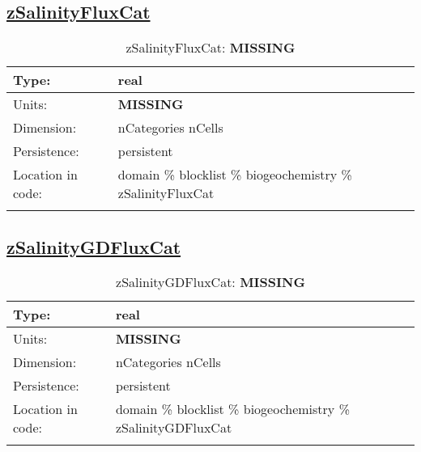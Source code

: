 \subsection[zSalinityFluxCat]{\hyperref[sec:var_tab_biogeochemistry]{zSalinityFluxCat}}
\label{subsec:var_sec_biogeochemistry_zSalinityFluxCat}
\begin{center}
\begin{longtable}{| p{2.0in} | p{4.0in} |}
        \hline 
        Type: & real \\
        \hline 
        Units: & {\bf \color{red} MISSING} \\
        \hline 
        Dimension: & nCategories nCells \\
        \hline 
        Persistence: & persistent \\
        \hline 
         Location in code: & domain \% blocklist \% biogeochemistry \% zSalinityFluxCat \\
         \hline 
    \caption{zSalinityFluxCat: {\bf \color{red} MISSING}}
\end{longtable}
\end{center}
\subsection[zSalinityGDFluxCat]{\hyperref[sec:var_tab_biogeochemistry]{zSalinityGDFluxCat}}
\label{subsec:var_sec_biogeochemistry_zSalinityGDFluxCat}
\begin{center}
\begin{longtable}{| p{2.0in} | p{4.0in} |}
        \hline 
        Type: & real \\
        \hline 
        Units: & {\bf \color{red} MISSING} \\
        \hline 
        Dimension: & nCategories nCells \\
        \hline 
        Persistence: & persistent \\
        \hline 
         Location in code: & domain \% blocklist \% biogeochemistry \% zSalinityGDFluxCat \\
         \hline 
    \caption{zSalinityGDFluxCat: {\bf \color{red} MISSING}}
\end{longtable}
\end{center}

